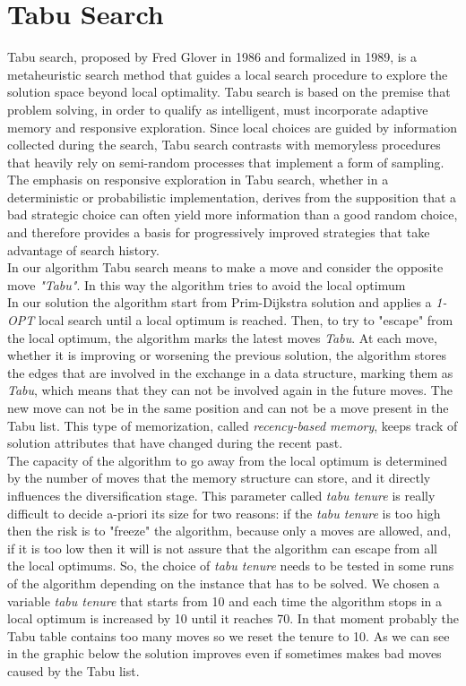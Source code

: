 \newpage
\section{Tabu Search}
Tabu search, proposed by Fred Glover in 1986 and formalized in 1989, is a metaheuristic search method that guides a local search procedure to explore the solution space beyond local optimality. Tabu search is based on the premise that problem solving, in order to qualify as intelligent, must incorporate adaptive memory and responsive exploration. Since local choices are guided by information collected during the search, Tabu search contrasts with memoryless procedures that heavily rely on semi-random processes that implement a form of sampling. The emphasis on responsive exploration in Tabu search, whether in a deterministic or probabilistic implementation, derives from the supposition that a bad strategic choice can often yield more information than a good random choice, and therefore provides a basis for progressively improved strategies that take advantage of search history.\\
In our algorithm Tabu search means to make a move and consider the opposite move \textit{"Tabu"}. In this way the algorithm tries to avoid the local optimum\\
In our solution the algorithm start from Prim-Dijkstra solution and applies a \textit{1-OPT} local search until a local optimum is reached. Then, to try to "escape" from the local optimum, the algorithm marks the latest moves \textit{Tabu}. At each move, whether it is improving or worsening the previous solution, the algorithm stores the edges that are involved in the exchange in a data structure, marking them as \textit{Tabu}, which means that they can not be involved again in the future moves. The new move can not be in the same position and can not be a move present in the Tabu list. This type of memorization, called \textit{recency-based memory}, keeps track of solution attributes that have changed during the recent past.\\
The capacity of the algorithm to go away from the local optimum is determined by the number of moves that the memory structure can store, and it directly influences the diversification stage. This parameter called \textit{tabu tenure} is really difficult to decide a-priori its size for two reasons: if the \textit{tabu tenure} is too high then the risk is to "freeze" the algorithm, because only a moves are allowed, and, if it is too low then it will is not assure that the algorithm can escape from all
the local optimums. So, the choice of \textit{tabu tenure} needs to be tested in some runs of the algorithm depending on the instance that has to be solved. We chosen a variable \textit{tabu tenure} that starts from 10 and each time the algorithm stops in a local optimum is increased by 10 until it reaches 70. In that moment probably the Tabu table contains too many moves so we reset the tenure to 10. As we can see in the graphic below the solution improves even if sometimes makes bad moves caused by the Tabu list.

